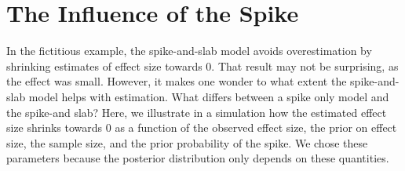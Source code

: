 \documentclass[a4paper]{article}
\newenvironment{revision}{\color{teal}}{\color{black}}
\begin{document}
\begin{revision}%
\section*{The Influence of the Spike}

In the fictitious example, the spike-and-slab model avoids overestimation by shrinking estimates of effect size towards 0.
That result may not be surprising, as the effect was small.
However, it makes one wonder to what extent the spike-and-slab model helps with estimation.
What differs between a spike only model and the spike-and slab?
Here, we illustrate in a simulation how the estimated effect size shrinks towards 0 as a function of the observed effect size, the prior on effect size, the sample size, and the prior probability of the spike.
We chose these parameters because the posterior distribution only depends on these quantities.


\end{revision}
\end{document}
